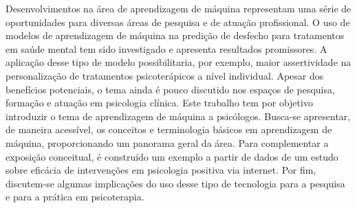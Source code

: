 \documentclass{article}
\begin{document}
Desenvolvimentos na área de aprendizagem de máquina representam uma série de oportunidades para diversas áreas de pesquisa e de atuação profissional.
O uso de modelos de aprendizagem de máquina na predição de desfecho para tratamentos em saúde mental tem sido investigado e apresenta resultados promissores.
A aplicação desse tipo de modelo possibilitaria, por exemplo, maior assertividade na personalização de tratamentos psicoterápicos a nível individual.
Apesar dos benefícios potenciais, o tema ainda é pouco discutido nos espaços de pesquisa, formação e atuação em psicologia clínica. Este trabalho tem
por objetivo introduzir o tema de aprendizagem de máquina a psicólogos. Busca-se apresentar, de maneira acessível, os conceitos e terminologia básicos
em aprendizagem de máquina, proporcionando um panorama geral da área. Para complementar a exposição conceitual, é construído um exemplo a partir de dados
de um estudo sobre eficácia de intervenções em psicologia positiva via internet. Por fim, discutem-se algumas implicações do uso desse tipo de tecnologia
para a pesquisa e para a prática em psicoterapia.
\end{document}
